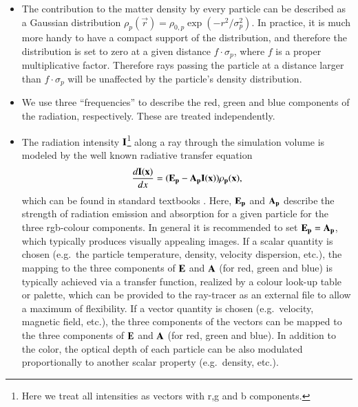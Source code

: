 \documentclass[1p,times]{elsarticle}
\begin{document}
\begin{itemize}
\item
The contribution to the matter density by every particle can
be described as a Gaussian distribution 
$\rho_p(\vec r)=\rho_{0,p}\exp(-r^2/\sigma_p^2)$.
In practice, it is much more handy to have a compact support of the
distribution, and therefore the distribution is set to zero at a given
distance $f\cdot\sigma_p$, where $f$ is a proper multiplicative factor. 
Therefore rays passing
the particle at a distance larger than $f\cdot\sigma_p$ will be
unaffected by the particle's density distribution.

\item 
We use three ``frequencies'' to describe the red, green and blue
components of the radiation, respectively. These are treated independently.

\item
The radiation intensity $\bf{I}$\footnote{Here we treat all
intensities as vectors with r,g and b components.} along a ray through the simulation
volume is modeled by the well known radiative transfer equation
\begin{equation}
\frac{d\bf{I}(x)}{dx}=(\bf{E}_p-\bf{A}_p\bf{I}(x))\rho_p(x),
\end{equation}
which can be found in standard textbooks \cite{1991par..book.....S}.
Here, $\bf{E}_p$ and $\bf{A}_p$ describe the strength of radiation emission and absorption
for a given particle for the three rgb-colour components. In general it is recommended to
set $\bf{E}_p=\bf{A}_p$, which typically produces visually appealing images.
If a scalar quantity is chosen (e.g.\ the particle temperature,
density, velocity dispersion, etc.), the mapping to the three components of $\bf{E}$ and $\bf{A}$ (for red, green and blue)
is typically achieved via a transfer function, realized by a colour look-up table or palette, which can
be provided to the ray-tracer as an external file to allow a maximum of flexibility. If a
vector quantity is chosen (e.g.\ velocity, magnetic field, etc.), the three components of the vectors
can be mapped to the three components of $\bf{E}$ and $\bf{A}$ (for red, green and blue). In addition 
to the color, the optical depth of each particle can be also modulated proportionally to another
scalar property (e.g.\ density, etc.).
\end{itemize}
\end{document}
